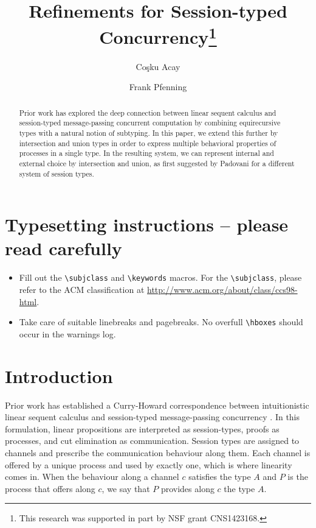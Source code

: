 \documentclass[a4paper,USenglish]{lipics-v2016}
\title{Refinements for Session-typed Concurrency\footnote{This research was supported in part by NSF grant CNS1423168.}}
\author[1]{Co\c{s}ku Acay}
\author[2]{Frank Pfenning}
\affil[1]{Carnegie Mellon University, Pittsburgh, PA 15213 \\
  \texttt{cacay@cmu.edu}}
\affil[2]{Carnegie Mellon University, Pittsburgh, PA 15213 \\
  \texttt{fp@cs.cmu.edu}}
\begin{document}
\maketitle

\begin{abstract}
Prior work has explored the deep connection between linear sequent calculus and session-typed message-passing concurrent computation by combining equirecursive types with a natural notion of subtyping. In this paper, we extend this further by intersection and union types in order to express multiple behavioral properties of processes in a single type. In the resulting system, we can represent internal and external choice by intersection and union, as first suggested by Padovani for a different system of session types.
\end{abstract}


\section{Typesetting instructions -- please read carefully}
\begin{itemize}
\item Fill out the \verb+\subjclass+ and \verb+\keywords+ macros. For the \verb+\subjclass+, please refer to the ACM classification at \url{http://www.acm.org/about/class/ccs98-html}.
\item Take care of suitable linebreaks and pagebreaks. No overfull \verb+\hboxes+ should occur in the warnings log.
\end{itemize}


\section{Introduction}

Prior work has established a Curry-Howard correspondence between intuitionistic linear sequent calculus and session-typed message-passing concurrency \cite{CairesP10, PfenningG15, Honda93}. In this formulation, linear propositions are interpreted as session-types, proofs as processes, and cut elimination as communication. Session types are assigned to channels and prescribe the communication behaviour along them. Each channel is offered by a unique process and used by exactly one, which is where linearity comes in. When the behaviour along a channel $c$ satisfies the type $A$ and $P$ is the process that offers along $c$, we say that $P$ provides along $c$ the type $A$.
\end{document}

